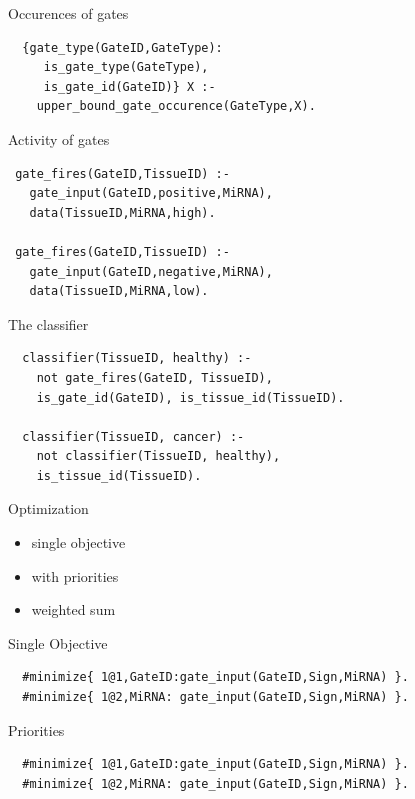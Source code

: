 \documentclass[10pt,dvipsnames]{beamer}
\begin{document}
\begin{frame}[fragile]{Occurences of gates}
 \begin{verbatim}
  {gate_type(GateID,GateType):
     is_gate_type(GateType),
     is_gate_id(GateID)} X :-
    upper_bound_gate_occurence(GateType,X).
 \end{verbatim}
\end{frame}
 

\begin{frame}[fragile]{Activity of gates}
 \begin{verbatim}
 gate_fires(GateID,TissueID) :-
   gate_input(GateID,positive,MiRNA),
   data(TissueID,MiRNA,high).
   
 gate_fires(GateID,TissueID) :-
   gate_input(GateID,negative,MiRNA),
   data(TissueID,MiRNA,low).
 \end{verbatim}
\end{frame}

\begin{frame}[fragile]{The classifier}
 \begin{verbatim}
  classifier(TissueID, healthy) :-
    not gate_fires(GateID, TissueID),
    is_gate_id(GateID), is_tissue_id(TissueID).
    
  classifier(TissueID, cancer) :-
    not classifier(TissueID, healthy),
    is_tissue_id(TissueID).
 \end{verbatim}
\end{frame}



\begin{frame}{Optimization}
 \begin{itemize}
  \item single objective
  \item with priorities
  \item weighted sum
 \end{itemize}
\end{frame}

\begin{frame}[fragile]{Single Objective}
 \begin{verbatim}
  #minimize{ 1@1,GateID:gate_input(GateID,Sign,MiRNA) }.
  #minimize{ 1@2,MiRNA: gate_input(GateID,Sign,MiRNA) }.
 \end{verbatim}
\end{frame}

\begin{frame}[fragile]{Priorities}
 \begin{verbatim}
  #minimize{ 1@1,GateID:gate_input(GateID,Sign,MiRNA) }.
  #minimize{ 1@2,MiRNA: gate_input(GateID,Sign,MiRNA) }.
 \end{verbatim}
\end{frame}
\end{document}
